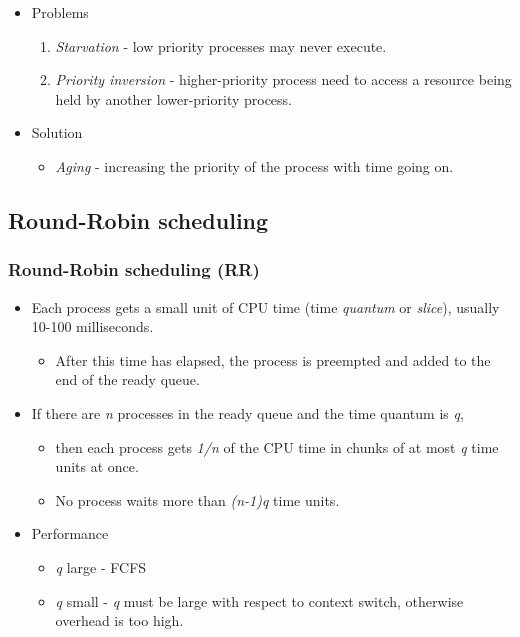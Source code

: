 \documentclass[CJKutf8,dvipsnames,table]{beamer}
\begin{document}
\begin{CJK*}{UTF8}{song}
\begin{frame}
\begin{itemize}
  \item{Problems} \pause
    \begin{enumerate}
    \item{\emph{Starvation} \pause - low priority processes may never execute.} \pause
    \item{\emph{Priority inversion} \pause - higher-priority process need to access a resource being held by another lower-priority process.} \pause
    \end{enumerate}
  \item{Solution} \pause
    \begin{itemize}
    \item{\emph{Aging} \pause - increasing the priority of the process with
      time going on.}
    \end{itemize}
  \end{itemize}
  \end{frame}
  
  \subsection{Round-Robin scheduling}

  \begin{frame}
  \frametitle{Round-Robin scheduling (RR)} \pause
  \begin{itemize}
  \item{Each process gets a small unit of CPU time (time \emph{quantum} or \emph{slice}), usually 10-100 milliseconds.} \pause
    \begin{itemize}
    \item{After this time has elapsed, the process is preempted and added to the end of the ready queue.} \pause
    \end{itemize}
  \item{If there are \textit{n} processes in the ready queue and the time quantum is \textit{q},} \pause
    \begin{itemize}
    \item{then each process gets \textit{1/n} of the CPU time in chunks of at most \textit{q} time units at once.} \pause
    \item{No process waits more than \textit{(n-1)q} time units.} \pause
    \end{itemize}
  \item{Performance} \pause
    \begin{itemize}
    \item{\textit{q} large \pause - FCFS} \pause
    \item{\textit{q} small \pause - \textit{q} must be large with respect to context switch, otherwise overhead is too high.}
    \end{itemize}
  \end{itemize}
  \end{frame}
  

\end{CJK*}
\end{document}
